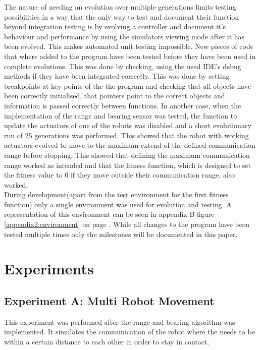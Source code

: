 The nature of needing an evolution over multiple generations limits testing possibilities in a way that the only way to test and document their function beyond integration testing is by evolving a controller and document it's behaviour and performance by using the simulators viewing mode after it has been evolved.
This makes automated unit testing impossible.
New pieces of code that where added to the program have been tested before they have been used in complete evolutions.
This was done by checking, using the used IDE's debug methods  if they have been integrated correctly. This was done by setting breakpoints at key points of the the program and checking that all objects have been correctly initialised, that pointers point to the correct objects and information is passed correctly between functions.
In another case, when the implementation of the range and bearing sensor was tested, the function to update the actuators of one of the robots was disabled and a short evolutionary run of 25 generations was performed.
This showed that the robot with working actuators evolved to move to the maximum extend of the defined communication range before stopping. 
This showed that defining the maximum communication range worked as intended and that the fitness function, which is designed to set the fitness value to 0 if they move outside their communication range, also worked.\\

During development(apart from the test environment for the first fitness function) only a single environment was used for evolution and testing.
A representation of this environment can be seen in appendix B figure \ref{appendix2:environment} on page \pageref{appendix2:environment}.
While all changes to the program have been tested multiple times only the milestones will be documented in this paper. 

\section{Experiments}
\subsection{Experiment A: Multi Robot Movement}
\label{chap4:movement}
This experiment was performed after the range and bearing algorithm was implemented. It simulates the communication of the robot where the needs to be within a certain distance to each other in order to stay in contact.\\

